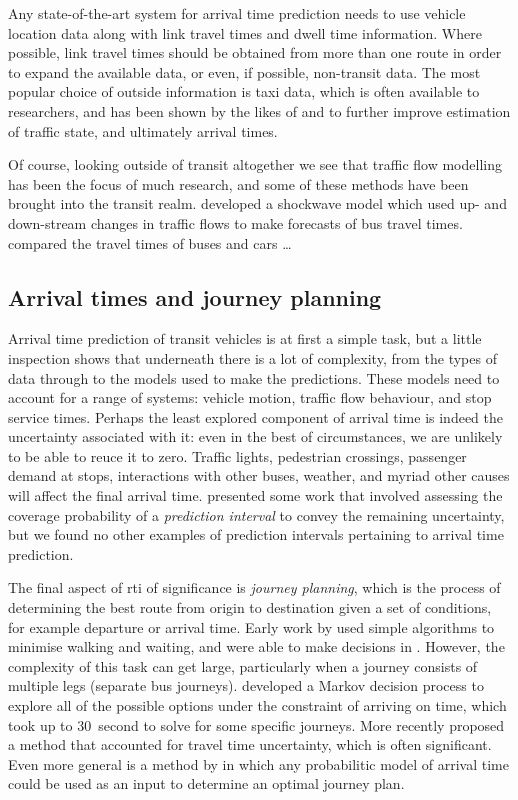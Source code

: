 Any state-of-the-art system for arrival time prediction needs to use \rt{} vehicle location data along with \rt{} link travel times and dwell time information. Where possible, link travel times should be obtained from more than one route in order to expand the available data, or even, if possible, non-transit data. The most popular choice of outside information is taxi data, which is often available to researchers, and has been shown by the likes of \citet{Xinghao_2013} and \citet{Ma_2019} to further improve estimation of traffic state, and ultimately arrival times.


Of course, looking outside of transit altogether we see that traffic flow modelling has been the focus of much research, and some of these methods have been brought into the transit realm. \citet{Julio_2016} developed a shockwave model which used up- and down-stream changes in traffic flows to make forecasts of bus travel times. \citet{Salonen_2013} compared the travel times of buses and cars \ldots


\subsection{Arrival times and journey planning}
\label{sec:intro_etas}


Arrival time prediction of transit vehicles is at first a simple task, but a little inspection shows that underneath there is a lot of complexity, from the types of data through to the models used to make the predictions. These models need to account for a range of systems: vehicle motion, traffic flow behaviour, and stop service times. Perhaps the least explored component of arrival time is indeed the uncertainty associated with it: even in the best of circumstances, we are unlikely to be able to reuce it to zero. Traffic lights, pedestrian crossings, passenger demand at stops, interactions with other buses, weather, and myriad other causes will affect the final arrival time. \citet{Mazloumi_2011} presented some work that involved assessing the coverage probability of a \emph{prediction interval} to convey the remaining uncertainty, but we found no other examples of prediction intervals pertaining to arrival time prediction.


The final aspect of \gls{rti} of significance is \emph{journey planning}, which is the process of determining the best route from origin to destination given a set of conditions, for example departure or arrival time. Early work by \citet{Horn_2004} used simple algorithms to minimise walking and waiting, and were able to make decisions in \rt{}. However, the complexity of this task can get large, particularly when a journey consists of multiple legs (separate bus journeys). \citet{Hame_2013a} developed a Markov decision process to explore all of the possible options under the constraint of arriving on time, which took up to 30~second to solve for some specific journeys. More recently \citet{Zheng_2016} proposed a method that accounted for travel time uncertainty, which is often significant. Even more general is a method by \citet{Berczi_2017} in which any probabilitic model of arrival time could be used as an input to determine an optimal journey plan.




